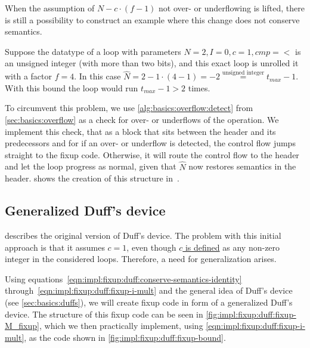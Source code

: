 



When the assumption of $N - c \cdot (f - 1)$ not over- or underflowing is lifted, there is still a possibility to construct an example where this change does not conserve semantics.

Suppose the datatype of a loop with parameters $N = 2, I = 0, c = 1, cmp = <$ is an unsigned integer (with more than two bits), and this exact loop is unrolled it with a factor $f = 4$.
In this case $\hat{N} = 2 - 1 \cdot (4 - 1) = -2 \overset{\text{unsigned integer}}{=} t_{max} - 1$.
With this bound the loop would run $t_{max} - 1 > 2$ times.

To circumvent this problem, we use \cref{alg:basics:overflow:detect} from \cref{sec:basics:overflow} as a check for over- or underflows of the operation.
We implement this check, that as a block that sits between the header and its predecessors and for if an over- or underflow is detected, the control flow jumps straight to the fixup code.
Otherwise, it will route the control flow to the header and let the loop progress as normal, given that $\hat{N}$ now restores semantics in the header.
 shows the creation of this structure in~\libFIRM.



\subsection{Generalized Duff's device}\label{sec:impl:fixup:duff}

 describes the original version of Duff's device.
The problem with this initial approach is that it assumes $c = 1$, even though \hyperref[sec:impl::def-c]{$c$ is defined} as any non-zero integer in the considered loops.
Therefore, a need for generalization arises.

Using equations~\ref{eqn:impl:fixup:duff:conserve-semantics-identity} through~\ref{eqn:impl:fixup:duff:fixup-i-mult} and the general idea of Duff's device (see \cref{sec:basics:duffs}), we will create fixup code in form of a generalized Duff's device.
The structure of this fixup code can be seen in \cref{fig:impl:fixup:duff:fixup-M_fixup}, which we then practically implement, using \cref{eqn:impl:fixup:duff:fixup-i-mult}, as the code shown in \cref{fig:impl:fixup:duff:fixup-bound}.



